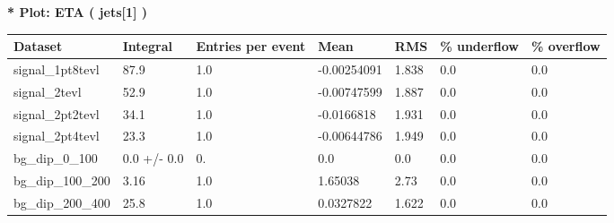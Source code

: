 \documentclass[a4paper, 10pt]{article}
\begin{document}
\textbf{* Plot: ETA ( jets[1] ) }\\
   \begin{table}[H]
  \begin{center}
    \begin{tabular}{|m{23.0mm}|m{23.0mm}|m{18.0mm}|m{19.0mm}|m{19.0mm}|m{19.0mm}|m{19.0mm}|}
      \hline
      {\cellcolor{yellow}         Dataset}& {\cellcolor{yellow}         Integral}& {\cellcolor{yellow}         Entries per event}& {\cellcolor{yellow}         Mean}& {\cellcolor{yellow}         RMS}& {\cellcolor{yellow}         \% underflow}& {\cellcolor{yellow}         \% overflow}\\
      \hline
      {\cellcolor{white}         signal\_1pt8tevl}& {\cellcolor{white}         87.9}& {\cellcolor{white}         1.0}& {\cellcolor{white}         -0.00254091}& {\cellcolor{white}         1.838}& {\cellcolor{green}         0.0}& {\cellcolor{green}         0.0}\\
      \hline
      {\cellcolor{white}         signal\_2tevl}& {\cellcolor{white}         52.9}& {\cellcolor{white}         1.0}& {\cellcolor{white}         -0.00747599}& {\cellcolor{white}         1.887}& {\cellcolor{green}         0.0}& {\cellcolor{green}         0.0}\\
      \hline
      {\cellcolor{white}         signal\_2pt2tevl}& {\cellcolor{white}         34.1}& {\cellcolor{white}         1.0}& {\cellcolor{white}         -0.0166818}& {\cellcolor{white}         1.931}& {\cellcolor{green}         0.0}& {\cellcolor{green}         0.0}\\
      \hline
      {\cellcolor{white}         signal\_2pt4tevl}& {\cellcolor{white}         23.3}& {\cellcolor{white}         1.0}& {\cellcolor{white}         -0.00644786}& {\cellcolor{white}         1.949}& {\cellcolor{green}         0.0}& {\cellcolor{green}         0.0}\\
      \hline
      {\cellcolor{white}         bg\_dip\_0\_100}& {\cellcolor{white}         0.0 +/\-- 0.0}& {\cellcolor{white}         0.}& {\cellcolor{white}         0.0}& {\cellcolor{white}         0.0}& {\cellcolor{green}         0.0}& {\cellcolor{green}         0.0}\\
      \hline
      {\cellcolor{white}         bg\_dip\_100\_200}& {\cellcolor{white}         3.16}& {\cellcolor{white}         1.0}& {\cellcolor{white}         1.65038}& {\cellcolor{white}         2.73}& {\cellcolor{green}         0.0}& {\cellcolor{green}         0.0}\\
      \hline
      {\cellcolor{white}         bg\_dip\_200\_400}& {\cellcolor{white}         25.8}& {\cellcolor{white}         1.0}& {\cellcolor{white}         0.0327822}& {\cellcolor{white}         1.622}& {\cellcolor{green}         0.0}& {\cellcolor{green}         0.0}\\

\end{tabular}
\end{center}
\end{table}
\end{document}
